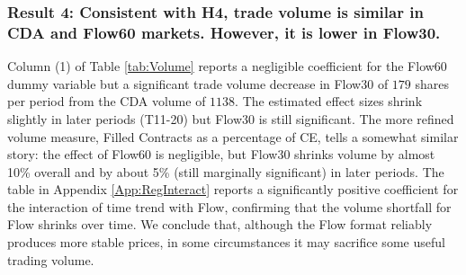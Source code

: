 \documentclass[12pt]{article}
\begin{document}
\subsubsection*{Result 4: Consistent with H4, trade volume is similar in CDA and Flow60 markets. However, it is lower in Flow30.}

Column (1) of Table \ref{tab:Volume} reports a negligible coefficient for the Flow60 dummy variable but a significant trade volume decrease in Flow30 of $179$ shares per period from the CDA volume of $1138$. The estimated effect sizes shrink slightly in later periods (T11-20) 
but Flow30 is still significant. 
The more refined volume measure, Filled Contracts as a percentage of CE, tells a somewhat similar story: the effect of Flow60 is negligible, but Flow30 shrinks volume by almost 10\% overall and by about 5\% (still marginally significant) in later periods. %
The table in Appendix \ref{App:RegInteract} reports a significantly positive coefficient for the interaction of time trend with Flow,
confirming that the volume shortfall for Flow shrinks over time.
We conclude that, although the Flow format reliably produces more stable prices, in some circumstances it may sacrifice some useful trading volume. 

\end{document}
